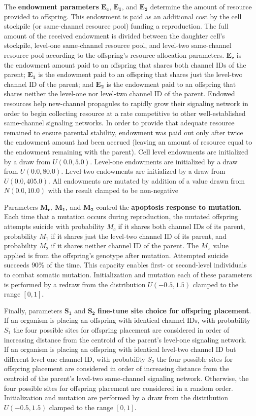 {The \textbf{endowment parameters} $\bm{E_{c}}$, $\bm{E_1}$, and $\bm{E_2}$ determine the amount of resource provided to offspring.
This endowment is paid as an additional cost by the cell stockpile (or same-channel resource pool) funding a reproduction.
The full amount of the received endowment is divided between the daughter cell's stockpile, level-one same-channel resource pool, and level-two same-channel resource pool according to the offspring's resource allocation parameters.
$\bm{E_{c}}$ is the endowment amount paid to an offspring that shares both channel IDs of the parent;
$\bm{E_1}$ is the endowment paid to an offspring that shares just the level-two channel ID of the parent;
and $\bm{E_2}$ is the endowment paid to an offspring that shares neither the level-one nor level-two channel ID of the parent.
Endowed resources help new-channel propagules to rapidly grow their signaling network in order to begin collecting resource at a rate competitive to other well-established same-channel signaling networks.
In order to provide that adequate resource remained to ensure parental stability, endowment was paid out only after twice the endowment amount had been accrued (leaving an amount of resource equal to the endowment remaining with the parent).
Cell level endowments are initialized by a draw from $U(0.0, 5.0)$.
Level-one endowments are initialized by a draw from $U(0.0, 80.0)$.
Level-two endowments are initialized by a draw from $U(0.0,405.0)$.
All endowments are mutated by addition of a value drawn from $N(0.0,10.0)$ with the result clamped to be non-negative

Parameters $\bm{M_{c}}$, $\bm{M_1}$, and $\bm{M_2}$ control the \textbf{apoptosis response to mutation}.
Each time that a mutation occurs during reproduction, the mutated offspring attempts suicide with probability $M_{c}$ if it shares both channel IDs of its parent, probability $M_1$ if it shares just the level-two channel ID of its parent, and probability $M_2$ if it shares neither channel ID of the parent.
The $M_x$ value applied is from the offspring's genotype after mutation.
Attempted suicide succeeds 90\% of the time.
This capacity enables first- or second-level individuals to combat somatic mutation.
Initialization and mutation each of these parameters is performed by a redraw from the distribution $U(-0.5,1.5)$ clamped to the range $[0,1]$.

Finally, parameters $\bm{S_1}$ and $\bm{S_2}$ \textbf{fine-tune site choice for offspring placement}.
If an organism is placing an offspring with identical channel IDs, with probability $S_1$ the four possible sites for offspring placement are considered in order of increasing distance from the centroid of the parent's level-one signaling network.
If an organism is placing an offspring with identical level-two channel ID but different level-one channel ID, with probability $S_2$ the four possible sites for offspring placement are considered in order of increasing distance from the centroid of the parent's level-two same-channel signaling network.
Otherwise, the four possible sites for offspring placement are considered in a random order.
Initialization and mutation are performed by a draw from the distribution $U(-0.5,1.5)$ clamped to the range $[0,1]$.

}
